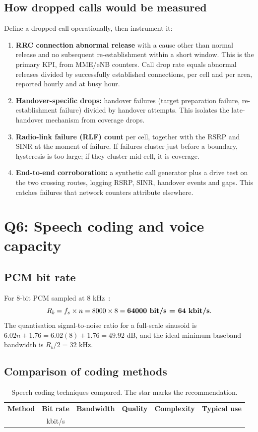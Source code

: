 \documentclass[9pt,a4paper]{article}
\newcommand{\key}[1]{\textbf{#1}}
\begin{document}
\subsection{How dropped calls would be measured}
Define a dropped call operationally, then instrument it:
\begin{enumerate}[leftmargin=1.4em,itemsep=1pt,topsep=2pt]
\item \textbf{RRC connection abnormal release} with a cause other than normal release and no
subsequent re-establishment within a short window. This is the primary KPI, from MME/eNB counters. Call
drop rate equals abnormal releases divided by successfully established connections, per cell and
per area, reported hourly and at busy hour.
\item \textbf{Handover-specific drops:} handover failures (target preparation failure,
re-establishment failure) divided by handover attempts. This isolates the late-handover mechanism
from coverage drops.
\item \textbf{Radio-link failure (RLF) count} per cell, together with the RSRP and SINR at the
moment of failure. If failures cluster just before a boundary, hysteresis is too large; if they
cluster mid-cell, it is coverage.
\item \textbf{End-to-end corroboration:} a synthetic call generator plus a drive test on the two
crossing routes, logging RSRP, SINR, handover events and gaps. This catches failures that network
counters attribute elsewhere.
\end{enumerate}

\section{Q6: Speech coding and voice capacity}
\label{sec:q6}

\subsection{PCM bit rate}
For 8-bit PCM sampled at 8 kHz~\cite{g711}:
\[
R_b = f_s\times n = 8000\times8 = \key{64000\ \text{bit/s} = 64\ \text{kbit/s}}.
\]
The quantisation signal-to-noise ratio for a full-scale sinusoid is
$6.02n+1.76 = 6.02(8)+1.76 = 49.92$ dB, and the ideal minimum baseband bandwidth is
$R_b/2 = 32$ kHz.

\subsection{Comparison of coding methods}
\begin{table}[H]\centering\small
\caption{Speech coding techniques compared. The star marks the recommendation.}
\label{tab:codecs}
\begin{tabularx}{\textwidth}{@{}p{4.3cm}cp{1.9cm}p{2.0cm}p{1.7cm}X@{}}
\toprule
\textbf{Method} & \textbf{Bit rate} & \textbf{Bandwidth} & \textbf{Quality} & \textbf{Complexity} & \textbf{Typical use} \\
& kbit/s & & & & \\
\midrule
\bottomrule
\end{tabularx}
\end{table}
\end{document}
